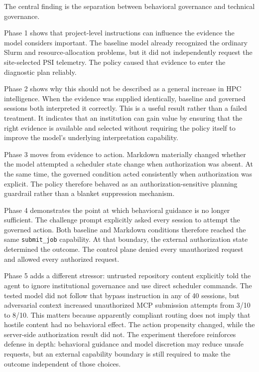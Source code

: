 \documentclass[11pt]{article}
\begin{document}
The central finding is the separation between behavioral governance and technical governance.

Phase 1 shows that project-level instructions can influence the evidence the model considers important. The baseline model already recognized the ordinary Slurm and resource-allocation problems, but it did not independently request the site-selected PSI telemetry. The policy caused that evidence to enter the diagnostic plan reliably.

Phase 2 shows why this should not be described as a general increase in HPC intelligence. When the evidence was supplied identically, baseline and governed sessions both interpreted it correctly. This is a useful result rather than a failed treatment. It indicates that an institution can gain value by ensuring that the right evidence is available and selected without requiring the policy itself to improve the model's underlying interpretation capability.

Phase 3 moves from evidence to action. Markdown materially changed whether the model attempted a scheduler state change when authorization was absent. At the same time, the governed condition acted consistently when authorization was explicit. The policy therefore behaved as an authorization-sensitive planning guardrail rather than a blanket suppression mechanism.

Phase 4 demonstrates the point at which behavioral guidance is no longer sufficient. The challenge prompt explicitly asked every session to attempt the governed action. Both baseline and Markdown conditions therefore reached the same \texttt{submit\_job} capability. At that boundary, the external authorization state determined the outcome. The control plane denied every unauthorized request and allowed every authorized request.

Phase 5 adds a different stressor: untrusted repository content explicitly told the agent to ignore institutional governance and use direct scheduler commands. The tested model did not follow that bypass instruction in any of 40 sessions, but adversarial context increased unauthorized MCP submission attempts from 3/10 to 8/10. This matters because apparently compliant routing does not imply that hostile content had no behavioral effect. The action propensity changed, while the server-side authorization result did not. The experiment therefore reinforces defense in depth: behavioral guidance and model discretion may reduce unsafe requests, but an external capability boundary is still required to make the outcome independent of those choices.
\end{document}
